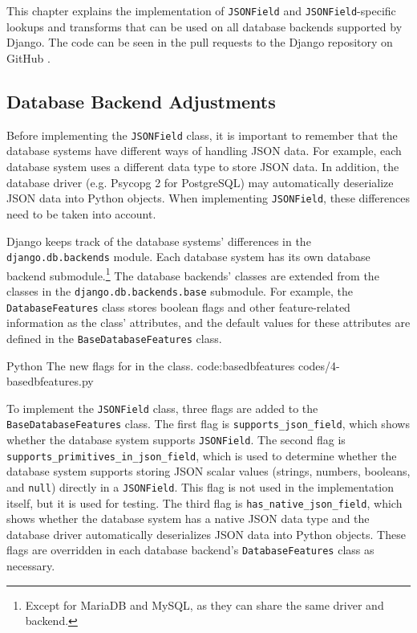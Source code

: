 \chapter{\babEmpat}

This chapter explains the implementation of \verb|JSONField| and
\verb|JSONField|-specific lookups and transforms that can be used on all
database backends supported by Django. The code can be seen in the pull
requests to the Django repository on GitHub
\cite{django:jsonfield-pr, django:contains-pr}.

\section{Database Backend Adjustments}

Before implementing the \verb|JSONField| class, it is important to remember
that the database systems have different ways of handling JSON data. For
example, each database system uses a different data type to store JSON data. In
addition, the database driver (e.g. Psycopg 2 for PostgreSQL) may automatically
deserialize JSON data into Python objects. When implementing \verb|JSONField|,
these differences need to be taken into account.

Django keeps track of the database systems' differences in the
\verb|django.db.backends| module. Each database system has its own database
backend submodule.\footnote{Except for MariaDB and MySQL, as they can share the
same driver and backend.} The database backends' classes are extended from the
classes in the \verb|django.db.backends.base| submodule. For example, the
\verb|DatabaseFeatures| class stores boolean flags and other feature-related
information as the class' attributes, and the default values for these
attributes are defined in the \verb|BaseDatabaseFeatures| class.

\listing
{Python}
{The new flags for  in the  class.}
{code:basedbfeatures}
{codes/4-basedbfeatures.py}

To implement the \verb|JSONField| class, three flags are added to the
\verb|BaseDatabaseFeatures| class. The first flag is
\verb|supports_json_field|, which shows whether the database system supports
\verb|JSONField|. The second flag is \verb|supports_primitives_in_json_field|,
which is used to determine whether the database system supports storing JSON
scalar values (strings, numbers, booleans, and \verb|null|) directly in a
\verb|JSONField|. This flag is not used in the  implementation
itself, but it is used for testing. The third flag is
\verb|has_native_json_field|, which shows whether the database system has a
native JSON data type and the database driver automatically deserializes JSON
data into Python objects. These flags are overridden in each database backend's
\verb|DatabaseFeatures| class as necessary.

